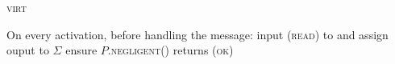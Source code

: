 \begin{center} %
  \begin{processbox}{\textsc{virt}}
    \begin{algorithmic}[1]
      \State On every activation, before handling the message:
      \Indent
         
          \State input (\textsc{read}) to \ledger and assign ouput to $\Sigma$
              \State ensure $P$.\textsc{negligent}() returns (\textsc{ok})
            \EndFor
          \EndIf
        \EndIf
      \EndIndent
      \Statex


\end{algorithmic}
\end{processbox}
\end{center}
